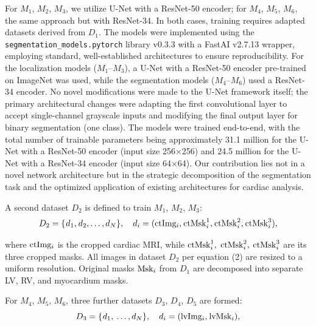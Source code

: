 \documentclass[fleqn,10pt]{wlscirep}
\begin{document}
For \({M_1}\), \({M_2}\), \({M_3}\), we utilize U-Net with a ResNet-50 encoder; for \({M_4}\), \({M_5}\), \({M_6},\) the same approach but with ResNet-34. In both cases, training requires adapted datasets derived from \({D_1}\).
The models were implemented using the \texttt{segmentation\_models.pytorch} library v0.3.3 with a FastAI v2.7.13 wrapper, employing standard, well-established architectures to ensure reproducibility. For the localization models (\({M_1}\)--\({M_3}\)), a U-Net with a ResNet-50 encoder pre-trained on ImageNet was used, while the segmentation models (\({M_4}\)--\({M_6}\)) used a ResNet-34 encoder. No novel modifications were made to the U-Net framework itself; the primary architectural changes were adapting the first convolutional layer to accept single-channel grayscale inputs and modifying the final output layer for binary segmentation (one class). The models were trained end-to-end, with the total number of trainable parameters being approximately 31.1 million for the U-Net with a ResNet-50 encoder (input size 256×256) and 24.5 million for the U-Net with a ResNet-34 encoder (input size 64×64). Our contribution lies not in a novel network architecture but in the strategic decomposition of the segmentation task and the optimized application of existing architectures for cardiac analysis.

A second dataset \({D_2}\) is defined to train \({M_1}\), \({M_2}\), \({M_3}\):
\begin{equation}
    {D_2} = \{ {\mkern 1mu} {d_1},{\mkern 1mu} {d_2}, \ldots ,{d_N}\} ,\quad {d_i} = ({\rm{ctIm}}{{\rm{g}}_i},{\mkern 1mu} {\rm{ctMsk}}_i^1,{\mkern 1mu} {\rm{ctMsk}}_i^2,{\mkern 1mu} {\rm{ctMsk}}_i^3),
\end{equation}

where \({\rm{ctIm}}{{\rm{g}}_i}\) is the cropped cardiac MRI, while \({\rm{ctMsk}}_i^1,\) \({\rm{ctMsk}}_i^2,\) \({\rm{ctMsk}}_i^3\) are its three cropped masks.
All images in dataset \({D_2}\) per equation (2) are resized to a uniform resolution. Original masks \({\rm{Ms}}{{\rm{k}}_i}\) from \({D_1}\) are decomposed into separate LV, RV, and myocardium masks.

For \({M_4}\), \({M_5}\), \({M_6}\), three further datasets \({D_3}\), \({D_4}\), \({D_5}\) are formed:
\begin{equation}
    {D_3} = \{ {\mkern 1mu} {d_1},{\mkern 1mu} \ldots ,{d_N}\} ,\quad {d_i} = ({\rm{lvIm}}{{\rm{g}}_i},{\mkern 1mu} {\rm{lvMs}}{{\rm{k}}_i}),
\end{equation}
\end{document}

